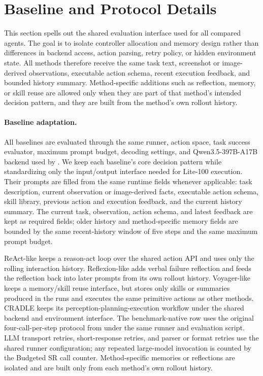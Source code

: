 \section{Baseline and Protocol Details}
\label{sec:appendix_protocol_details}

This section spells out the shared evaluation interface used for all compared
agents. The goal is to isolate controller allocation and memory design rather
than differences in backend access, action parsing, retry policy, or hidden
environment state. All methods therefore receive the same task text, screenshot
or image-derived observations, executable action schema, recent execution
feedback, and bounded history summary. Method-specific additions such as
reflection, memory, or skill reuse are allowed only when they are part of that
method's intended decision pattern, and they are built from the method's own
rollout history.

\paragraph{Baseline adaptation.}
\label{sec:appendix_baseline_adaptation}
All baselines are evaluated through the same \stardojo{} runner, action space,
task success evaluator, maximum prompt budget, decoding settings, and
Qwen3.5-397B-A17B backend used by \method{}. We keep each baseline's core
decision pattern while standardizing only the input/output interface needed for
Lite-100 execution. Their prompts are filled from the same runtime fields
whenever applicable: task description, current observation or image-derived
facts, executable action schema, skill library, previous action and execution
feedback, and the current history summary. The current task, observation,
action schema, and latest feedback are kept as required fields; older history
and method-specific memory fields are bounded by the same recent-history window
of five steps and the same maximum prompt budget.

ReAct-like keeps a reason-act loop over the shared action API and uses only the
rolling interaction history. Reflexion-like adds verbal failure reflection and
feeds the reflection back into later prompts from its own rollout history.
Voyager-like keeps a memory/skill reuse interface, but stores only skills or
summaries produced in the \stardojo{} runs and executes the same primitive
actions as other methods. CRADLE keeps its perception-planning-execution
workflow under the shared backend and environment interface. The benchmark-native
\stardojo{} row uses the original four-call-per-step protocol from \stardojo{}
under the same runner and evaluation script. LLM transport retries,
short-response retries, and parser or format retries use the shared runner
configuration; any repeated large-model invocation is counted by the Budgeted
SR call counter. Method-specific memories or reflections are isolated and are
built only from each method's own rollout history.

